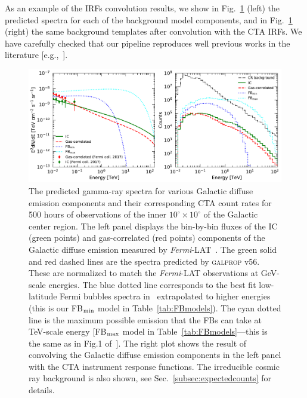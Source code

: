 \documentclass[doublespace,nopageskip]{VTthesis}
\begin{document}
As an example of the IRFs convolution results, we show in Fig.~\ref{fig:counts_spectra} (left) the predicted spectra for each of the background model components, and in Fig.~\ref{fig:counts_spectra} (right) the same background templates after convolution with the CTA IRFs. We have carefully checked that our pipeline reproduces well previous works in the literature [e.g.,~\citep{2021PhRvD.103b3011R}].

\begin{figure}[htb]
    \centering
    \includegraphics[width=\textwidth]{Figures/CTA/spectra-and-counts.pdf}
    \caption{The predicted gamma-ray spectra for various Galactic diffuse emission components and their corresponding CTA count rates for 500 hours of observations of the inner $10^\circ \times 10^\circ$ of the Galactic center region. The left panel displays the bin-by-bin fluxes of the IC (green points) and gas-correlated (red points) components of the Galactic diffuse emission measured by \textit{Fermi}-LAT~\citep{2017ApJ...840...43A}. The green solid and red dashed lines are the spectra predicted by \textsc{galprop} v56. These are normalized to match the \textit{Fermi}-LAT observations at GeV-scale energies. The blue dotted line corresponds to the best fit low-latitude Fermi bubbles spectra in~\citep{2017ApJ...840...43A} extrapolated to higher energies (this is our FB$_{\rm min}$ model in Table~\ref{tab:FBmodels}). The cyan dotted line is the maximum possible emission that the FBs can take at TeV-scale energy [FB$_{\rm max}$ model in Table~\ref{tab:FBmodels}---this is the same as in Fig.1 of~\citet{2021PhRvD.103b3011R}]. The right plot shows the result of convolving the Galactic diffuse emission components in the left panel with the CTA instrument response functions. The irreducible cosmic ray background is also shown, see Sec.~\ref{subsec:expectedcounts} for details.}
    \label{fig:counts_spectra}
\end{figure}
\end{document}
